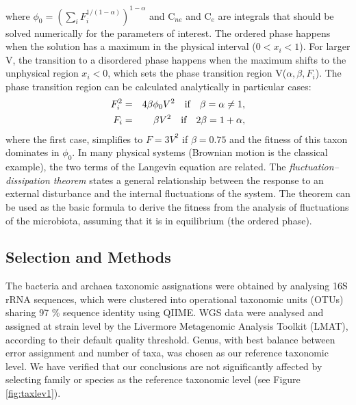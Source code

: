 where $\phi_0 = (\sum_i F_i^{1/(1-\alpha)})^{1-\alpha}$ and C$_{ne}$ and C$_{e}$ are integrals that should be solved numerically for the parameters of interest. The ordered phase happens when the solution has a maximum in the physical interval ($0<x_i<1$). For larger V, the transition to a disordered phase happens when the maximum shifts to the unphysical region $x_i<0$, which sets the phase transition region V($\alpha,\beta,F_i$). The phase transition region can be calculated analytically in particular cases:
\begin{eqnarray}
F_i^2 &=& 4 \beta \phi_0 V^2\quad \textrm{if} \quad  \beta = \alpha \neq 1, \notag \\
F_i &=& \beta V^2\quad \textrm{if} \quad  2\beta = 1+\alpha,
\notag
\end{eqnarray}
where the first case, simplifies to $F= 3 V^2$ if $\beta = 0.75$ and the fitness of this taxon dominates in $\phi_0$. 
In many physical systems (Brownian motion is the classical example), the two terms of the Langevin equation are related.  The \emph{fluctuation--dissipation theorem} states a general relationship between the response to an external disturbance and the internal fluctuations of the system\cite{FD}. The theorem can be used as the basic formula to derive the fitness from the analysis of fluctuations 
of the microbiota, assuming that it is in equilibrium (the ordered phase).  



\subsection*{Selection and Methods}

The bacteria and archaea taxonomic assignations were obtained by analysing 16S rRNA sequences, which were clustered into operational taxonomic units (OTUs) sharing 97 \% sequence identity using QIIME\cite{QIIME}. WGS data\cite{kwashiorkor} were analysed and assigned at strain level by the Livermore Metagenomic Analysis Toolkit (LMAT)\cite{LMAT}, according to their default quality threshold. Genus, with best balance between error assignment and number of taxa, was chosen as our reference taxonomic level. We have verified that our conclusions are not significantly affected by selecting family or species as the reference taxonomic level (see Figure \ref{fig:taxlev1}).


